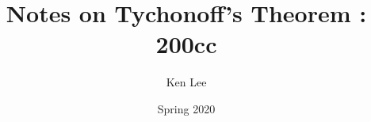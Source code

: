 \documentclass{article}
\theoremstyle{lemmastyle}
\theoremstyle{definitionstyle}
\theoremstyle{exercisestyle}
\theoremstyle{claimstyle}
\newcommand{\<}{\langle}
\renewcommand{\>}{\rangle}
\begin{document}
\title{Notes on Tychonoff's Theorem : 200cc}
\author{Ken Lee}
\date{Spring 2020}
\maketitle

\tableofcontents






\end{document}
